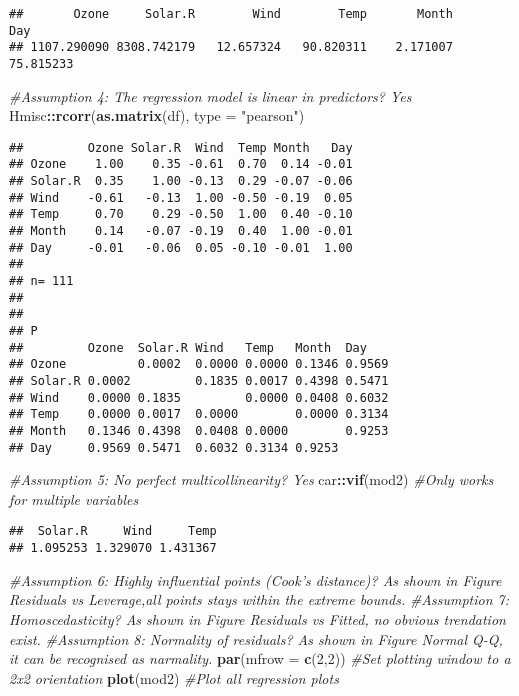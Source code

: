 \documentclass[]{article}
\newenvironment{Shaded}{\begin{snugshade}}{\end{snugshade}}
\newcommand{\CommentTok}[1]{\textcolor[rgb]{0.56,0.35,0.01}{\textit{#1}}}
\newcommand{\DataTypeTok}[1]{\textcolor[rgb]{0.13,0.29,0.53}{#1}}
\newcommand{\DecValTok}[1]{\textcolor[rgb]{0.00,0.00,0.81}{#1}}
\newcommand{\KeywordTok}[1]{\textcolor[rgb]{0.13,0.29,0.53}{\textbf{#1}}}
\newcommand{\NormalTok}[1]{#1}
\newcommand{\OperatorTok}[1]{\textcolor[rgb]{0.81,0.36,0.00}{\textbf{#1}}}
\newcommand{\StringTok}[1]{\textcolor[rgb]{0.31,0.60,0.02}{#1}}
\begin{document}
\begin{verbatim}
##       Ozone     Solar.R        Wind        Temp       Month         Day 
## 1107.290090 8308.742179   12.657324   90.820311    2.171007   75.815233
\end{verbatim}

\begin{Shaded}
\begin{Highlighting}[]
\CommentTok{#Assumption 4: The regression model is linear in predictors? Yes}
\NormalTok{Hmisc}\OperatorTok{::}\KeywordTok{rcorr}\NormalTok{(}\KeywordTok{as.matrix}\NormalTok{(df), }\DataTypeTok{type =} \StringTok{"pearson"}\NormalTok{)}
\end{Highlighting}
\end{Shaded}

\begin{verbatim}
##         Ozone Solar.R  Wind  Temp Month   Day
## Ozone    1.00    0.35 -0.61  0.70  0.14 -0.01
## Solar.R  0.35    1.00 -0.13  0.29 -0.07 -0.06
## Wind    -0.61   -0.13  1.00 -0.50 -0.19  0.05
## Temp     0.70    0.29 -0.50  1.00  0.40 -0.10
## Month    0.14   -0.07 -0.19  0.40  1.00 -0.01
## Day     -0.01   -0.06  0.05 -0.10 -0.01  1.00
## 
## n= 111 
## 
## 
## P
##         Ozone  Solar.R Wind   Temp   Month  Day   
## Ozone          0.0002  0.0000 0.0000 0.1346 0.9569
## Solar.R 0.0002         0.1835 0.0017 0.4398 0.5471
## Wind    0.0000 0.1835         0.0000 0.0408 0.6032
## Temp    0.0000 0.0017  0.0000        0.0000 0.3134
## Month   0.1346 0.4398  0.0408 0.0000        0.9253
## Day     0.9569 0.5471  0.6032 0.3134 0.9253
\end{verbatim}

\begin{Shaded}
\begin{Highlighting}[]
\CommentTok{#Assumption 5: No perfect multicollinearity? Yes}
\NormalTok{car}\OperatorTok{::}\KeywordTok{vif}\NormalTok{(mod2) }\CommentTok{#Only works for multiple variables}
\end{Highlighting}
\end{Shaded}

\begin{verbatim}
##  Solar.R     Wind     Temp 
## 1.095253 1.329070 1.431367
\end{verbatim}

\begin{Shaded}
\begin{Highlighting}[]
\CommentTok{#Assumption 6: Highly influential points (Cook's distance)? As shown in Figure Residuals vs Leverage,all points stays within the extreme bounds. }
\CommentTok{#Assumption 7: Homoscedasticity? As shown in Figure Residuals vs Fitted, no obvious trendation exist.}
\CommentTok{#Assumption 8: Normality of residuals? As shown in Figure Normal Q-Q, it can be recognised as narmality.}
\KeywordTok{par}\NormalTok{(}\DataTypeTok{mfrow =} \KeywordTok{c}\NormalTok{(}\DecValTok{2}\NormalTok{,}\DecValTok{2}\NormalTok{))  }\CommentTok{#Set plotting window to a 2x2 orientation}
\KeywordTok{plot}\NormalTok{(mod2)           }\CommentTok{#Plot all regression plots}
\end{Highlighting}
\end{Shaded}
\end{document}

